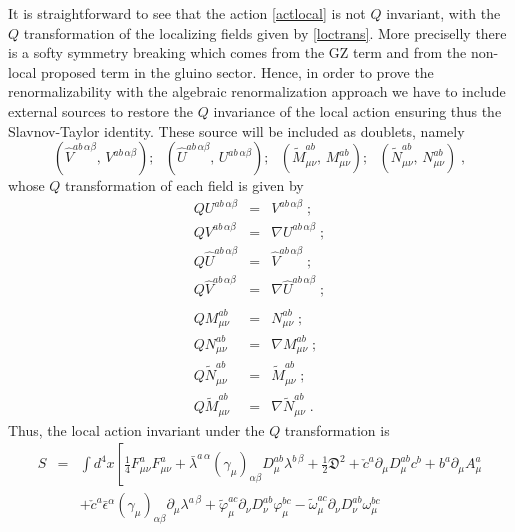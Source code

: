 \begin{appendix}
%
%
%
It is straightforward to see that the action \eqref{actlocal} is not $Q$ invariant, with the $Q$ transformation of the localizing fields given by \eqref{loctrans}.
More preciselly there is a softy symmetry breaking which comes from the GZ term and from the non-local proposed term in the gluino sector. Hence, in order to prove the renormalizability with the algebraic renormalization approach we have to include external sources to restore the $Q$ invariance of the local action ensuring thus the Slavnov-Taylor identity. These source will be included as doublets, namely
\begin{equation}
(\hat{V}^{ab\,\alpha\beta},\,V^{ab\,\alpha\beta}); ~~~ (\hat{U}^{ab\,\alpha\beta},\,U^{ab\,\alpha\beta}); ~~~ (\tilde{M}^{ab}_{\mu\nu},\,M^{ab}_{\mu\nu}); ~~~ (\tilde{N}^{ab}_{\mu\nu},\,N^{ab}_{\mu\nu})\;,
\end{equation}
whose $Q$ transformation of each field is given by
\begin{eqnarray}
QU^{ab\,\alpha\beta} &=& V^{ab\,\alpha\beta}\;; \nonumber \\
QV^{ab\,\alpha\beta} &=& \nabla U^{ab\,\alpha\beta}\;; \nonumber \\
Q\hat{U}^{ab\,\alpha\beta} &=& \hat{V}^{ab\,\alpha\beta}\; ; \nonumber \\
Q \hat{V}^{ab\,\alpha\beta} &=& \nabla\hat{U}^{ab\,\alpha\beta}\;; \nonumber \\
{}\nonumber \\
QM^{ab}_{\mu\nu} &=& N^{ab}_{\mu\nu}\;; \nonumber \\
QN^{ab}_{\mu\nu} &=& \nabla M^{ab}_{\mu\nu}\;; \nonumber \\
Q\tilde{N}^{ab}_{\mu\nu} &=& \tilde{M}^{ab}_{\mu\nu}\;; \nonumber \\
Q\tilde{M}^{ab}_{\mu\nu} &=& \nabla \tilde{N}^{ab}_{\mu\nu}\;. \nonumber
\end{eqnarray}
%
%
%
Thus, the local action invariant under the $Q$ transformation is
\begin{eqnarray}
\label{ac1}
S &=& \int d^{4}x \left[ \frac{1}{4}F^{a}_{\mu \nu}F^{a}_{\mu\nu} 
+ \bar{\lambda}^{a\,\alpha}(\gamma_{\mu})_{\alpha\beta}D^{ab}_{\mu}\lambda^{b\,\beta}
+ \frac{1}{2}\mathfrak{D}^{2} + \check{c}^{a}\partial_{\mu}D^{ab}_{\mu}c^{b} 
+ b^{a}\partial_{\mu}A^{a}_{\mu} \right. 
\nonumber \\
&&
\left. 
+ \check{c}^{a}\bar{\epsilon}^{\alpha}(\gamma_{\mu})_{\alpha\beta}\partial_{\mu}\lambda^{a\,\beta}
+\tilde{\varphi}^{ac}_{\mu}\partial_{\nu}D_{\nu}^{ab}\varphi^{bc}_{\mu} 
- \tilde{\omega}^{ac}_{\mu}\partial_{\nu}D_{\nu}^{ab}\omega^{bc}_{\mu} 

\end{eqnarray}
\end{appendix}
